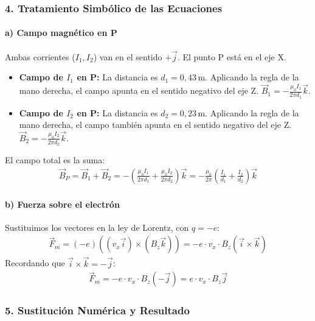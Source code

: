 \subsubsection*{4. Tratamiento Simbólico de las Ecuaciones}
\paragraph{a) Campo magnético en P}
Ambas corrientes ($I_1, I_2$) van en el sentido $+\vec{j}$. El punto P está en el eje X.
\begin{itemize}
    \item \textbf{Campo de $I_1$ en P:} La distancia es $d_1 = 0,43 \, \text{m}$. Aplicando la regla de la mano derecha, el campo apunta en el sentido negativo del eje Z. $\vec{B}_1 = -\frac{\mu_0 I_1}{2\pi d_1}\vec{k}$.
    \item \textbf{Campo de $I_2$ en P:} La distancia es $d_2 = 0,23 \, \text{m}$. Aplicando la regla de la mano derecha, el campo también apunta en el sentido negativo del eje Z. $\vec{B}_2 = -\frac{\mu_0 I_2}{2\pi d_2}\vec{k}$.
\end{itemize}
El campo total es la suma:
\begin{gather}
    \vec{B}_P = \vec{B}_1 + \vec{B}_2 = -\left( \frac{\mu_0 I_1}{2\pi d_1} + \frac{\mu_0 I_2}{2\pi d_2} \right)\vec{k} = -\frac{\mu_0}{2\pi}\left( \frac{I_1}{d_1} + \frac{I_2}{d_2} \right)\vec{k}
\end{gather}

\paragraph{b) Fuerza sobre el electrón}
Sustituimos los vectores en la ley de Lorentz, con $q=-e$:
\begin{gather}
    \vec{F}_m = (-e) \left( (v_x \vec{i}) \times (B_z \vec{k}) \right) = -e \cdot v_x \cdot B_z (\vec{i} \times \vec{k})
\end{gather}
Recordando que $\vec{i} \times \vec{k} = -\vec{j}$:
\begin{gather}
    \vec{F}_m = -e \cdot v_x \cdot B_z (-\vec{j}) = e \cdot v_x \cdot B_z \vec{j}
\end{gather}

\subsubsection*{5. Sustitución Numérica y Resultado}
